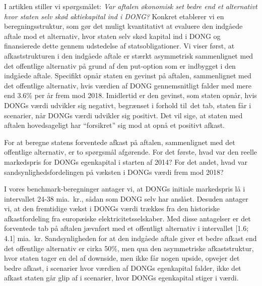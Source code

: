 \documentclass{article}
\begin{document}
I artiklen stiller vi spørgsmålet: \emph{Var aftalen økonomisk set bedre end et alternativt hvor staten selv skød aktiekapital ind i DONG?} Konkret etablerer vi en beregningsstruktur, som gør det muligt kvantitativt at evaluere den indgåede aftale mod et alternativ, hvor staten selv skød kapital ind i DONG og finansierede dette gennem udstedelse af statsobligationer. Vi viser først, at afkaststrukturen i den indgåede aftale er stærkt asymmetrisk sammenlignet med det offentlige alternativ på grund af den put-option som er indbygget i den indgåede aftale. Specifikt opnår staten en gevinst på aftalen, sammenlignet med det offentlige alternativ, hvis værdien af DONG gennemsnitligt falder med mere end 3.6\% per år frem mod 2018. Imidlertid er den gevinst, som staten opnår, hvis DONGs værdi udvikler sig negativt, begrænset i forhold til\ det tab, staten får i scenarier, når DONGs værdi udvikler sig positivt. Det vil sige, at staten med aftalen hovedsageligt har \enquote{forsikret} sig mod at opnå et positivt afkast. 

For at beregne statens forventede afkast på aftalen, sammenlignet med det offentlige alternativ, er to spørgsmål afgørende. For det første, hvad var den reelle markedspris for DONGs egenkapital i starten af 2014? For det andet, hvad var sandsynlighedsfordelingen på væksten i DONGs værdi frem mod 2018? 

I vores benchmark-beregninger antager vi, at DONGs initiale markedspris lå i intervallet 24-38 mia.\ kr., sådan som DONG selv har anslået. Desuden antager vi, at den fremtidige vækst i DONGs værdi trækkes fra den historiske afkastfordeling fra europæiske elektricitetsselskaber. Med disse antagelser er det forventede tab på aftalen jævnført med et offentligt alternativ i intervallet [1.6; 4.1] mia.\ kr. Sandsynligheden for at den indgåede aftale giver et bedre afkast end det offentlige alternativ er cirka 50\%, men qua den asymmetriske afkaststruktur, hvor staten tager en del af downside, men ikke får nogen upside, opvejer det bedre afkast, i scenarier hvor værdien af DONGs egenkapital falder, ikke det afkast staten går glip af i  scenarier, hvor DONGs egenkapital stiger i værdi.

\end{document}
